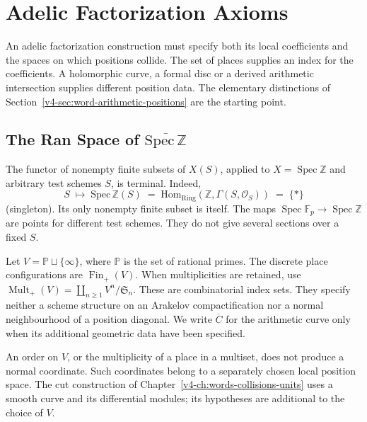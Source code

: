 \chapter{Adelic Factorization Axioms}
\label{v4-arith:costello-gwilliam}

An adelic factorization construction must specify both its local
coefficients and the spaces on which positions collide. The set of
places supplies an index for the coefficients. A holomorphic curve,
a formal disc or a derived arithmetic intersection supplies different
position data. The elementary distinctions of
Section~\ref{v4-sec:word-arithmetic-positions} are the starting point.

\section{The Ran Space of \(\overline{\mathrm{Spec}\,\mathbb{Z}}\)}
\label{v4-arith:cg:ran-space}

\begin{observation}
\label{v4-arith:obs:ran-naive-terminal}
The functor of nonempty finite subsets of \(X(S)\), applied to
\(X=\operatorname{Spec}\mathbb Z\) and arbitrary test schemes \(S\),
is terminal. Indeed,
\begin{equation*}
S\;\mapsto\;\mathrm{Spec}\,\mathbb{Z}(S)\;=\;\mathrm{Hom}_{\mathrm{Ring}}(\mathbb{Z},\Gamma(S,\mathcal{O}_{S}))\;=\;\{*\}
\end{equation*}
(singleton). Its only nonempty finite subset is itself. The maps
\(\operatorname{Spec}\mathbb F_p\to\operatorname{Spec}\mathbb Z\)
are points for different test schemes. They do not give several
sections over a fixed \(S\).
\end{observation}

\begin{definition}
\label{v4-arith:def:ran-Arakelov}
Let \(V=\mathbb P\sqcup\{\infty\}\), where \(\mathbb P\) is the set
of rational primes. The discrete place configurations are
\(\operatorname{Fin}_{+}(V)\). When multiplicities are retained,
use \(\operatorname{Mult}_{+}(V)=\coprod_{n\ge1}V^n/\mathfrak S_n\).
These are combinatorial index sets. They specify neither a scheme
structure on an Arakelov compactification nor a normal neighbourhood
of a position diagonal. We write \(\overline C\) for the arithmetic
curve only when its additional geometric data have been specified.
\end{definition}

\begin{remark}
An order on \(V\), or the multiplicity of a place in a multiset,
does not produce a normal coordinate. Such coordinates belong to a
separately chosen local position space. The cut construction of
Chapter~\ref{v4-ch:words-collisions-units} uses a smooth curve and
its differential modules; its hypotheses are additional to the
choice of \(V\).
\end{remark}


